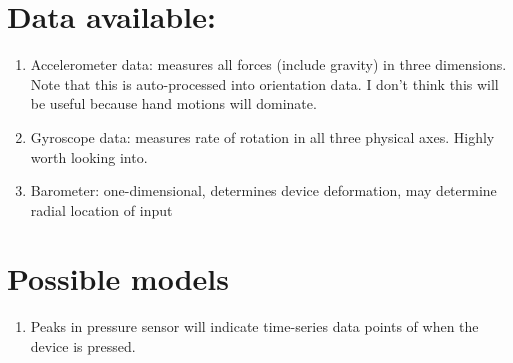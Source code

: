 \documentclass[12pt]{article}
\begin{document}

\section{Data available:}
\begin{enumerate}
	\item Accelerometer data: measures all forces (include gravity) in three dimensions. Note that this is auto-processed into orientation data. I don't think this will be useful because hand motions will dominate.
	\item Gyroscope data: measures rate of rotation in all three physical axes. Highly worth looking into.
	\item Barometer: one-dimensional, determines device deformation, may determine radial location of input
\end{enumerate}

\section{Possible models}
\begin{enumerate}
	\item Peaks in pressure sensor will indicate time-series data points of when the device is pressed. 
\end{enumerate}
\end{document}
